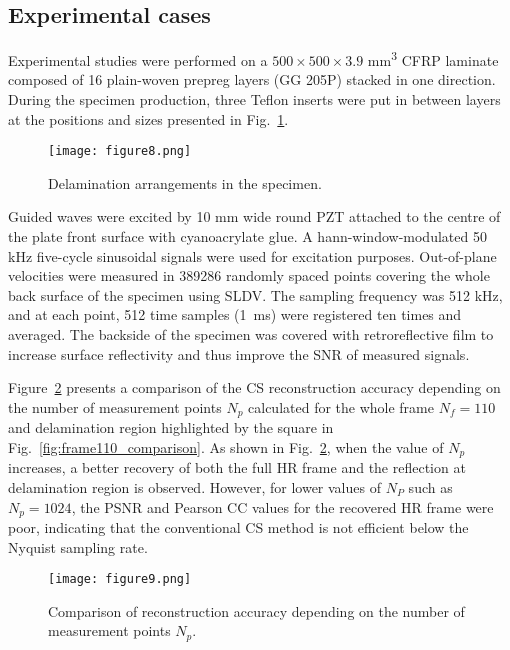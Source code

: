 \subsection{Experimental cases}

Experimental studies were performed on a $500 \times 500\times 3.9$ mm\textsuperscript{3} CFRP laminate composed of 16 plain-woven prepreg layers (GG 205P) stacked in one direction. 
During the specimen production, three Teflon inserts were put in between layers at the positions and sizes presented in Fig.~\ref{fig:specimen}.

\begin{figure} [!ht]
	\centering
	\texttt{[image: figure8.png]}
	\caption{Delamination arrangements in the specimen.}
	\label{fig:specimen}
\end{figure}

Guided waves were excited by 10 mm wide round PZT attached to the centre of the plate front surface with cyanoacrylate glue. 
A hann-window-modulated 50 kHz five-cycle sinusoidal signals were used for excitation purposes.
Out-of-plane velocities were measured in 389286 randomly spaced points covering the whole back surface of the specimen using SLDV. 
The sampling frequency was 512 kHz, and at each point, 512 time samples (1 ms) were registered ten times and averaged.
The backside of the specimen was covered with retroreflective film to increase surface reflectivity and thus improve the SNR of measured signals.

Figure~\ref{fig:points_metrics} presents a comparison of the CS reconstruction accuracy depending on the number of measurement points $N_p$ calculated for the whole frame $N_f=110$ and delamination region highlighted by the square in Fig.~\ref{fig:frame110_comparison}.
As shown in Fig.~\ref{fig:points_metrics}, when the value of $N_p$ increases, a better recovery of both the full HR frame and the reflection at delamination region is observed.
However, for lower values of $N_P$ such as $N_p=1024$, the PSNR and Pearson CC values for the recovered HR frame were poor, indicating that the conventional CS method is not efficient below the Nyquist sampling rate.

\begin{figure} [!ht]
	\centering
	\texttt{[image: figure9.png]}
	\caption{Comparison of reconstruction accuracy depending on the number of measurement points $N_p$.}
	\label{fig:points_metrics}
\end{figure}

